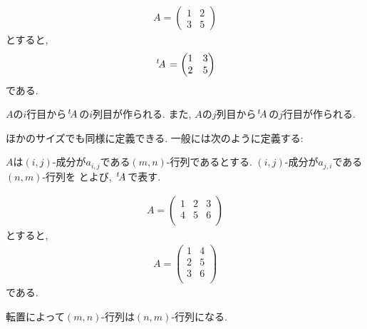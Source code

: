 \begin{example}
  \begin{align*}
    A=
    \begin{pmatrix}
      1&2\\
      3&5
    \end{pmatrix}
  \end{align*}
  とすると,
  \begin{align*}
    {\left.^{t}\!A\right.}=
    \begin{pmatrix}
      1&3\\
      2&5
    \end{pmatrix}
  \end{align*}
  である.
\end{example}
\begin{remark}
  $A$の$i$行目から${\left.^{t}\!A\right.}$の$i$列目が作られる.
  また,
  $A$の$j$列目から${\left.^{t}\!A\right.}$の$j$行目が作られる.
\end{remark}
ほかのサイズでも同様に定義できる.
一般には次のように定義する:
\begin{definition}
  \label{def:op:transpose}
  $A$は$(i,j)$-成分が$a_{i,j}$である$(m,n)$-行列であるとする.
  $(i,j)$-成分が$a_{j,i}$である$(n,m)$-行列を
  とよび,
  ${\left.^{t}\!A\right.}$で表す.
\end{definition}
\begin{example}
  \begin{align*}
    A=
    \begin{pmatrix}
      1&2&3\\
      4&5&6\\
    \end{pmatrix}
  \end{align*}
  とすると,
  \begin{align*}
    A=
    \begin{pmatrix}
      1&4\\
      2&5\\
      3&6\\
    \end{pmatrix}
  \end{align*}
  である.
\end{example}
\begin{remark}
  転置によって$(m,n)$-行列は$(n,m)$-行列になる.
\end{remark}


